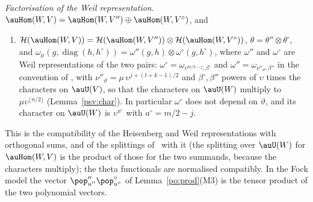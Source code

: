 \documentclass[10pt]{amsart}
\theoremstyle{definition}
\theoremstyle{remark}
\begin{document}
\emph{Factorisation of the Weil representation.} $\auHom(W,V)=\auHom(W,V'')\oplus\auHom(W,
V^\circ)$, and
\begin{enumerate}
\item[(W7)] $\mathcal H(\auHom(W,V))=\mathcal H(\auHom(W,V''))\otimes\mathcal H(\auHom(W,
V^\circ))$, $\theta=\theta''\otimes\theta^\circ$, and $\omega_\mu(g,\operatorname{diag}(h,h^\circ))
=\omega''(g,h)\otimes\omega^\circ(g,h^\circ)$, where $\omega''$ and $\omega^\circ$ are Weil
representations of the two pairs: $\omega^\circ=\omega_{\upsilon^{m/2-j},\beta^\circ}$ and
$\omega''=\omega_{\nu''_\vartheta,\beta''}$ in the convention of {\cite[\S2.3]{P53}}, with
$\nu''_\vartheta=\mu\,\upsilon^{j+(t+k-1)/2}$ and $\beta^\circ,\beta''$ powers of $\upsilon$ times the
characters on $\auU(V)$, so that the characters on $\auU(W)$ multiply to $\mu\upsilon^{\lfloor
n/2\rfloor}$ (Lemma~\ref{psv:char}). In particular $\omega^\circ$ does not depend on $\vartheta$, and
its character on $\auU(W)$ is $\upsilon^{a^\circ}$ with $a^\circ=m/2-j$.
\end{enumerate}
This is the compatibility of the Heisenberg and Weil representations with orthogonal sums, and of
the splittings of~\cite{KudlaSplitting} with it (the splitting over $\auU(W)$ for $\auHom(W,V)$
is the product of those for the two summands, because the characters multiply); the theta
functionals are normalised compatibly. In the Fock model the vector $\pop''_{u''}\pop^\circ_{
u^\circ}$ of Lemma~\ref{po:prod}(M3) is the tensor product of the two polynomial vectors.
\end{document}
